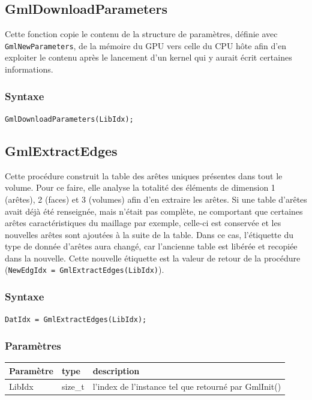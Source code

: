 \documentclass[a4paper,12pt]{article}
\begin{document}
\subsection{GmlDownloadParameters}

Cette fonction copie le contenu de la structure de paramètres, définie avec {\tt GmlNewParameters}, de la mémoire du GPU vers celle du CPU hôte afin d'en exploiter le contenu après le lancement d'un kernel qui y aurait écrit certaines informations.

\subsubsection*{Syntaxe}
{\tt GmlDownloadParameters(LibIdx);}


\subsection{GmlExtractEdges}
Cette procédure construit la table des arêtes uniques présentes dans tout le volume.
Pour ce faire, elle analyse la totalité des éléments de dimension 1 (arêtes), 2 (faces) et 3 (volumes) afin d'en extraire les arêtes.
Si une table d'arêtes avait déjà été renseignée, mais n'était pas complète, ne comportant que certaines arêtes caractéristiques du maillage par exemple, celle-ci est conservée et les nouvelles arêtes sont ajoutées à la suite de la table. Dans ce cas, l'étiquette du type de donnée d'arêtes aura changé, car l'ancienne table est libérée et recopiée dans la nouvelle. Cette nouvelle étiquette est la valeur de retour de la procédure ({\tt NewEdgIdx = GmlExtractEdges(LibIdx)}).

\subsubsection*{Syntaxe}

{\tt DatIdx = GmlExtractEdges(LibIdx);}

\subsubsection*{Paramètres}

\begin{tabular}{|m{2cm}|m{1.5cm}|m{10.5cm}|}
\hline
Paramètre  & type    & description \\
\hline
LibIdx     & size\_t & l'index de l'instance tel que retourné par GmlInit() \\
\hline
\end{tabular}
\end{document}
